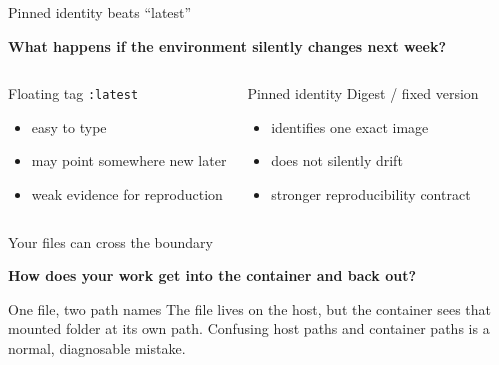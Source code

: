 \documentclass[aspectratio=169,11pt]{beamer}
\newcommand{\bigquestion}[1]{%
  \begin{center}
  \vspace{0.15em}
  {\Large\bfseries\color{DeepNavy}#1}
  \end{center}
}
\begin{document}
\begin{frame}{Pinned identity beats ``latest''}
\bigquestion{What happens if the environment silently changes next week?}

\begin{columns}[T,onlytextwidth]
\begin{alertblock}{Floating tag}
\texttt{:latest}
\begin{itemize}
  \item easy to type
  \item may point somewhere new later
  \item weak evidence for reproduction
\end{itemize}
\end{alertblock}

\begin{exampleblock}{Pinned identity}
Digest / fixed version
\begin{itemize}
  \item identifies one exact image
  \item does not silently drift
  \item stronger reproducibility contract
\end{itemize}
\end{exampleblock}
\end{columns}
\end{frame}

\begin{frame}{Your files can cross the boundary}
\bigquestion{How does your work get into the container and back out?}

\begin{center}
\end{center}

\begin{block}{One file, two path names}
The file lives on the host, but the container sees that mounted folder at its own path. Confusing host paths and container paths is a normal, diagnosable mistake.
\end{block}
\end{frame}
\end{document}
